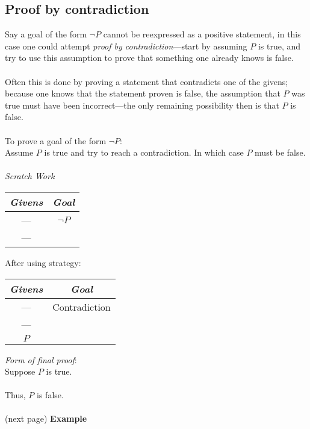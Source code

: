 \documentclass{report}
\theoremstyle{definition}
\begin{document}
\subsection{Proof by contradiction}
Say a goal of the form $\neg P$ cannot be reexpressed as a positive statement, in this case one could attempt \textit{proof by contradiction}---start by assuming $P$ is true, and try to use this
assumption to prove that something one already knows is false.\\
\vspace{1mm}\\
Often this is done by proving a statement that contradicts one of the givens; because one knows that the statement proven is false, the assumption that $P$ was true must have been incorrect---the
only remaining possibility then is that $P$ is false.\\
\vspace{1mm}\\
\indent To prove a goal of the form $\neg P$:\\
\indent Assume $P$ is true and try to reach a contradiction. In which case $P$ must be false.\\
\vspace{1mm}\\
\textit{Scratch Work}
\begin{center}
\begin{tabular}{c|c}
\textit{Givens}&\textit{Goal}\\
\hline
---&$\neg P$\\
---&
\end{tabular}
\end{center}
After using strategy:
\begin{center}
\begin{tabular}{c|c}
\textit{Givens}&\textit{Goal}\\
\hline
---&Contradiction\\
---&\\
$P$&
\end{tabular}
\end{center}
\textit{Form of final proof}:\\
\indent Suppose $P$ is true.\\
\indent{}\\
\indent Thus, $P$ is false.\\
\vspace{1mm}\\
(next page)\newpage
\noindent\textbf{Example}\\
\end{document}
